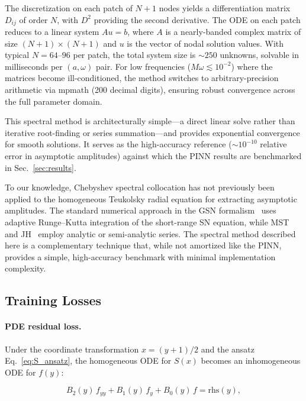 \documentclass[aps,prd,twocolumn,superscriptaddress,nofootinbib]{revtex4-2}
\begin{document}
The discretization on each patch of $N+1$ nodes yields a differentiation
matrix $D_{ij}$ of order $N$, with $D^2$ providing the second derivative.
The ODE on each patch reduces to a linear system $A u = b$, where $A$ is a
nearly-banded complex matrix of size $(N+1) \times (N+1)$ and $u$ is the
vector of nodal solution values.  With typical $N = 64$--$96$ per patch,
the total system size is ${\sim}250$ unknowns, solvable in milliseconds per
$(a,\omega)$ pair.  For low frequencies ($M\omega \lesssim 10^{-2}$) where
the matrices become ill-conditioned, the method switches to arbitrary-precision
arithmetic via mpmath (200 decimal digits), ensuring robust convergence across
the full parameter domain.

This spectral method is architecturally simple---a direct linear solve rather
than iterative root-finding or series summation---and provides exponential
convergence for smooth solutions.  It serves as the high-accuracy reference
($\sim 10^{-10}$ relative error in asymptotic amplitudes) against which the
PINN results are benchmarked in Sec.~\ref{sec:results}.

To our knowledge, Chebyshev spectral collocation has not previously been
applied to the homogeneous Teukolsky radial equation for extracting
asymptotic amplitudes.  The standard numerical approach in the GSN
formalism~\cite{Rico:2023gwl} uses adaptive Runge--Kutta integration of the
short-range SN equation, while MST~\cite{Mano:1996gn} and
JH~\cite{Jiang:2025jh} employ analytic or semi-analytic series.  The
spectral method described here is a complementary technique that, while
not amortized like the PINN, provides a simple, high-accuracy benchmark
with minimal implementation complexity.

\subsection{Training Losses}
\label{sec:losses}

\paragraph{PDE residual loss.}  Under the coordinate transformation
$x = (y+1)/2$ and the ansatz Eq.~\eqref{eq:S_ansatz}, the homogeneous ODE for
$S(x)$ becomes an inhomogeneous ODE for $f(y)$:

\begin{equation}\label{eq:ode_f}
  B_2(y)\, f_{yy} + B_1(y)\, f_y + B_0(y)\, f = \mathrm{rhs}(y),
\end{equation}
\end{document}

